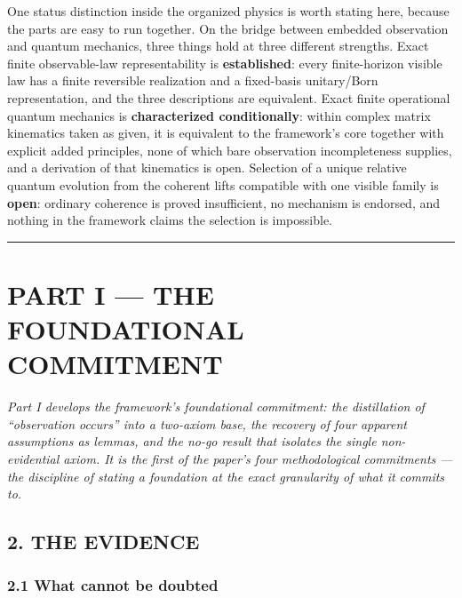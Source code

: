 \documentclass[
]{article}
\begin{document}
One status distinction inside the organized physics is worth stating
here, because the parts are easy to run together. On the bridge between
embedded observation and quantum mechanics, three things hold at three
different strengths. Exact finite observable-law representability is
\textbf{established}: every finite-horizon visible law has a finite
reversible realization and a fixed-basis unitary/Born representation,
and the three descriptions are equivalent. Exact finite operational
quantum mechanics is \textbf{characterized conditionally}: within
complex matrix kinematics taken as given, it is equivalent to the
framework's core together with explicit added principles, none of which
bare observation incompleteness supplies, and a derivation of that
kinematics is open. Selection of a unique relative quantum evolution
from the coherent lifts compatible with one visible family is
\textbf{open}: ordinary coherence is proved insufficient, no mechanism
is endorsed, and nothing in the framework claims the selection is
impossible.

\begin{center}\rule{0.5\linewidth}{0.5pt}\end{center}

\hypertarget{part-i-the-foundational-commitment}{%
\section{PART I --- THE FOUNDATIONAL
COMMITMENT}\label{part-i-the-foundational-commitment}}

\emph{Part I develops the framework's foundational commitment: the
distillation of ``observation occurs'' into a two-axiom base, the
recovery of four apparent assumptions as lemmas, and the no-go result
that isolates the single non-evidential axiom. It is the first of the
paper's four methodological commitments --- the discipline of stating a
foundation at the exact granularity of what it commits to.}

\hypertarget{the-evidence}{%
\subsection{2. THE EVIDENCE}\label{the-evidence}}

\hypertarget{what-cannot-be-doubted}{%
\subsubsection{2.1 What cannot be
doubted}\label{what-cannot-be-doubted}}
\end{document}
